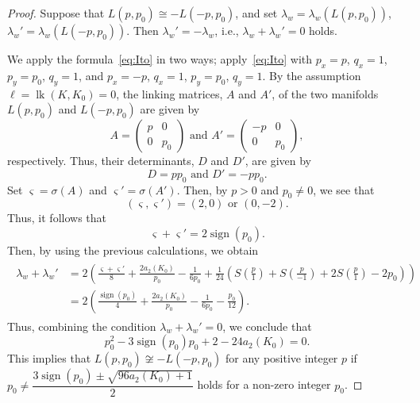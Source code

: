 \documentclass{amsart}
\theoremstyle{remark}
\newcommand{\sign}{\mathop{\mathrm{sign}}\nolimits}
\newcommand{\lk}{\mathop{\mathrm{lk}}\nolimits}
\begin{document}
\begin{proof}
Suppose that $L(p,p_0) \cong -L(-p, p_0)$, and set $\lambda_w = \lambda_w ( L(p,p_0))$, $\lambda_w' = \lambda_w ( L(- p, p_0))$. 
Then $\lambda_w' = - \lambda_w$, i.e., $\lambda_w + \lambda_w' = 0$ holds. 

We apply the formula~\eqref{eq:Ito} in two ways; apply~\eqref{eq:Ito} with $p_x = p$, $q_x=1$, $p_y=p_0$, $q_y=1$, and $p_x = -p$, $q_x = 1$, $p_y=p_0$, $q_y=1$. 
By the assumption $\ell=\lk (K,K_0) = 0$, 
the linking matrices, $A$ and $A'$, of the two manifolds $L(p,p_0)$ and $L(-p, p_0)$ are given by
\[ A = \begin{pmatrix} p & 0 \\ 0 & p_0 \end{pmatrix} \text{ and } A'=\begin{pmatrix} -p & 0 \\ 0 & p_0 \end{pmatrix}, \] 
respectively. 
Thus, their determinants, $D$ and $D'$, are given by 
\[ D = p p_0 \text{ and } D' = -p p_0 . \]
Set $\varsigma = \sigma(A)$ and $\varsigma'= \sigma(A')$. 
Then, by $p>0$ and $p_0 \ne 0$, we see that 
\[ ( \varsigma , \varsigma' ) = ( 2 , 0) \text{ or } (0,-2) . \]
Thus, it follows that 
\[ \varsigma + \varsigma' = 2 \sign(p_0) .\]
Then, by using the previous calculations, we obtain 
\begin{align*}
    \begin{split}
    \lambda_w + \lambda_w'
    &= 2 \left( \frac{\varsigma + \varsigma'}{8} 
     +\frac{2 a_2 (K_0) }{p_0} - \frac{1}{6 p_0} 
      + \frac{1}{24} \left( S\left( \frac{p}{1} \right) + S\left( \frac{p}{-1} \right) + 2 S\left( \frac{p}{1} \right) - 2 p_0 \right) \right)\\
    &= 2 \left( \frac{\sign(p_0)}{4} 
     +\frac{2 a_2 (K_0) }{p_0} - \frac{1}{6 p_0} - \frac{p_0}{12}
     \right). 
    \end{split}
\end{align*}
Thus, combining the condition $\lambda_w + \lambda_w' =0$, we conclude that
\[ p_0^2 - 3 \sign(p_0) p_0  + 2 - 24 a_2(K_0) =0. \]
This implies that $L(p,p_0) \not\cong - L(-p, p_0)$ for any positive integer $p$ if $p_0 \ne \dfrac{3\sign(p_0) \pm \sqrt{96a_2(K_0)+1}}{2}$ holds for a non-zero integer $p_0$. 
\end{proof}
\end{document}
